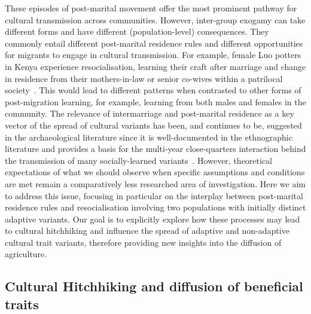 \documentclass[9pt,twocolumn,twoside,lineno]{pnas-new}
\begin{document}
These episodes of post-marital movement offer the most prominent pathway for cultural transmission across communities.
However, inter-group exogamy can take different forms and have different (population-level) consequences. 
They commonly entail different post-marital residence rules and different opportunities for migrants to engage in cultural transmission.
%
For example, female Luo potters in Kenya experience resocialisation, learning their craft after marriage and change in residence from their mothers-in-law or senior co-wives within a patrilocal society~\citep{herbich_long_2008}. 
This would lead to different patterns when contrasted to other forms of post-migration learning, for example, learning from both males and females in the community. %
The relevance of intermarriage and post-marital residence as a key vector of the spread of cultural variants has been, and continues to be, suggested in the archaeological literature since it is well-documented in the ethnographic literature and provides a basis for the multi-year close-quarters interaction behind the transmission of many socially-learned variants~\citep{kohler_how_2013,sanger_post-marital_2020,mills_intermarriage_2018,lycett_spatially_2020, roux_ethnoarchaeology_2007}. 
However, theoretical expectations of what we should observe when specific assumptions and conditions are met remain a comparatively less researched area of investigation. Here we aim to address this issue, focusing in particular on the interplay between post-marital residence rules and resocialisation involving two populations with initially distinct adaptive variants. 
Our goal is to explicitly explore how these processes may lead to cultural hitchhiking and influence the spread of adaptive and non-adaptive cultural trait variants, therefore providing new insights into the diffusion of agriculture. 

\subsection*{Cultural Hitchhiking and diffusion of beneficial traits}
\end{document}
